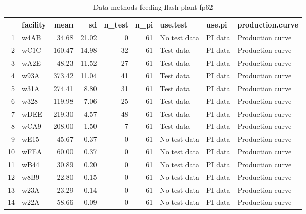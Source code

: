 \begin{table}[H]
\centering
\begin{tabular}{rlrrrrlll}
  \hline
 & facility & mean & sd & n\_test & n\_pi & use.test & use.pi & production.curve \\ 
  \hline
1 & w4AB & 34.68 & 21.02 &   0 &  61 & No test data & PI data & Production curve \\ 
  2 & wC1C & 160.47 & 14.98 &  32 &  61 & Test data & PI data & Production curve \\ 
  3 & wA2E & 48.23 & 11.52 &  27 &  61 & Test data & PI data & Production curve \\ 
  4 & w93A & 373.42 & 11.04 &  41 &  61 & Test data & PI data & Production curve \\ 
  5 & w31A & 274.41 & 8.80 &  31 &  61 & Test data & PI data & Production curve \\ 
  6 & w328 & 119.98 & 7.06 &  25 &  61 & Test data & PI data & Production curve \\ 
  7 & wDEE & 219.30 & 4.57 &  48 &  61 & Test data & PI data & Production curve \\ 
  8 & wCA9 & 208.00 & 1.50 &   7 &  61 & Test data & PI data & Production curve \\ 
  9 & wE15 & 45.67 & 0.37 &   0 &  61 & No test data & PI data & Production curve \\ 
  10 & wFEA & 60.00 & 0.37 &   0 &  61 & No test data & PI data & Production curve \\ 
  11 & wB44 & 30.89 & 0.20 &   0 &  61 & No test data & PI data & Production curve \\ 
  12 & w8B9 & 22.80 & 0.15 &   0 &  61 & No test data & PI data & Production curve \\ 
  13 & w23A & 23.29 & 0.14 &   0 &  61 & No test data & PI data & Production curve \\ 
  14 & w22A & 58.66 & 0.09 &   0 &  61 & No test data & PI data & Production curve \\ 
   \hline
\end{tabular}
\caption{Data methods feeding flash plant fp62} 
\label{tab:well_summaries_fp15}
\end{table}

